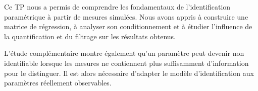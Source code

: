 \documentclass[10pt,a4paper,twocolumn]{article}
\begin{document}
Ce TP nous a permis de comprendre les fondamentaux de l'identification
paramétrique à partir de mesures simulées. Nous avons appris à construire
une matrice de régression, à analyser son conditionnement et à étudier
l'influence de la quantification et du filtrage sur les résultats obtenus.

L'étude complémentaire montre également qu'un paramètre peut devenir
non identifiable lorsque les mesures ne contiennent plus suffisamment
d'information pour le distinguer. Il est alors nécessaire d'adapter le
modèle d'identification aux paramètres réellement observables.

\balance
\end{document}
